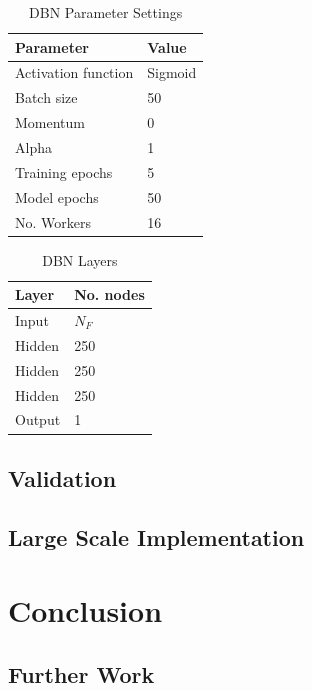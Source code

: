 \documentclass[a4paper, 11pt, twocolumn]{report}
\begin{document}
\begin{table}[h]
\centering
\small{
\caption{DBN Parameter Settings}
\label{table:dbnparams}
\begin{tabular}{|l|l|} \hline
\textbf{Parameter}&\textbf{Value}\\ \hline
Activation function & Sigmoid\\ \hline
Batch size & 50\\ \hline
Momentum & 0\\ \hline
Alpha & 1\\ \hline
Training epochs & 5\\ \hline
Model epochs & 50\\ \hline
No. Workers & 16\\ \hline
\end{tabular}}
\end{table}


\begin{table}[h]
\centering
\small{
\caption{DBN Layers}
\label{table:dbnlayers}
\begin{tabular}{|l|l|} \hline
\textbf{Layer}&\textbf{No. nodes}\\ \hline
Input & $N_F$\\ \hline
Hidden & 250\\ \hline
Hidden & 250\\ \hline
Hidden & 250\\ \hline
Output & 1\\ \hline
\end{tabular}}
\end{table}


\subsection{Validation}

\subsection{Large Scale Implementation}





\section{Conclusion}

\subsection{Further Work}


\printbibliography
\end{document}
